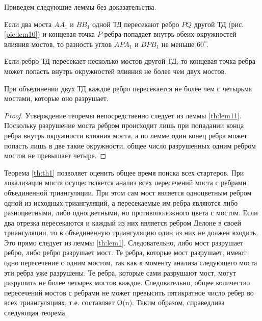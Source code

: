 \documentclass[12pt]{article}
\begin{document}
Приведем следующие леммы без доказательства.

\begin{lemma}
\label{th:lem10}
Если два моста $AA_1$ и $BB_1$ одной ТД пересекают ребро $PQ$ другой ТД (рис. \ref{pic:lem10})
и концевая точка $P$ ребра попадает внутрь обеих окружностей влияния мостов,
то разность углов $APA_1$ и $BPB_1$ не меньше $60^\circ$.
\end{lemma}

\begin{lemma}
\label{th:lem11}
Если ребро ТД пересекает несколько мостов другой ТД, то концевая
точка ребра может попасть внутрь окружностей влияния не более чем двух мостов.
\end{lemma}

\begin{theorem}
\label{th:th1}
При объединении двух ТД каждое ребро пересекается не более чем с четырьмя мостами, которые оно разрушает.
\end{theorem}

\begin{proof}
Утверждение теоремы непосредственно следует из леммы \ref{th:lem11}.
Поскольку разрушение моста ребром происходит лишь при попадании конца ребра внутрь окружности влияния моста,
а по лемме один конец ребра может попасть лишь в две такие окружности,
общее число разрушенных одним ребром мостов не превышает четыре.
\end{proof}

Теорема \ref{th:th1} позволяет оценить общее время поиска всех стартеров.
При локализации моста осуществляется анализ всех пересечений моста с ребрами объединенной триангуляции.
При этом сам мост является одноцветным ребром одной из исходных триангуляций,
а пересекаемые им ребра являются либо разноцветными,
либо одноцветными, но противоположного цвета с мостом.
Если два отрезка пересекаются и каждый из них является ребром Делоне в своей триангуляции,
то в объединенную триангуляцию один из них не должен входить.
Это прямо следует из леммы \ref{th:lem1}.
Следовательно, либо мост разрушает ребро, либо ребро разрушает мост.
Те ребра, которые мост разрушает, имеют одно пересечение с одним мостом,
так как к моменту анализа следующего моста эти ребра уже разрушены.
Те ребра, которые сами разрушают мост, могут разрушить не более четырех мостов каждое.
Следовательно, общее количество пересечений мостов с ребрами не может превысить пятикратное число ребер во всех триангуляциях,
т.е. составляет O(n).
Таким образом, справедлива следующая теорема.
\end{document}
